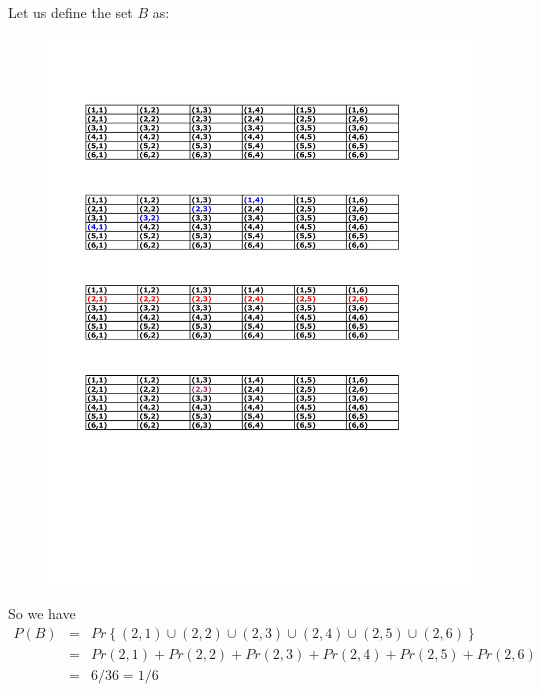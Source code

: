 \documentclass[notes=show, handout]{beamer}\usepackage[]{graphicx}\usepackage[]{color}
\newcommand{\bea}{\begin{eqnarray}}
\newcommand{\eea}{\end{eqnarray}}
\newcommand{\nn}{\nonumber}
\begin{document}
\begin{frame}{\secname}

  \begin{example}[A check]
  Let us define the set $B$ as:

  \begin{figure}[h!]
  \centering
  \includegraphics[scale=0.7]{img/c3.pdf}
  \end{figure}
  So we have
  \footnotesize{
  \bea
  P(B) &=& Pr\left\{ (2,1) \cup (2,2) \cup (2,3) \cup (2,4) \cup (2,5) \cup (2,6)     \right\} \nn \\
   &=&  Pr(2,1) + Pr(2,2) + Pr(2,3) + Pr(2,4) + Pr(2,5) + Pr(2,6) \nn \\
   &=& 6/36 =1/6 \nn
  \eea}

  \end{example}
\end{frame}
\end{document}
